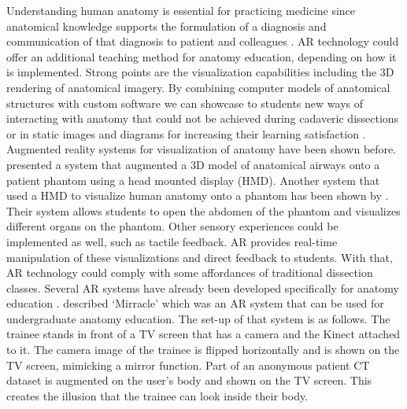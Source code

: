 Understanding human anatomy is essential for practicing medicine since anatomical knowledge supports the formulation of a diagnosis and communication of that diagnosis to patient and colleagues \cite{Frank2005}.  AR technology could offer an additional teaching method for anatomy education, depending on how it is implemented. Strong points are the visualization capabilities including the 3D rendering of anatomical imagery.
By combining computer models of anatomical structures with custom software we can showcase to students new ways of interacting with anatomy that could not be achieved during cadaveric dissections or in static images and diagrams for increasing their learning satisfaction \cite{Bacca2014,ma2013ismar,NMC2014}.
Augmented reality systems for visualization of anatomy have been shown before. \cite{Davis2002} presented a system that augmented a 3D model of anatomical airways onto a patient phantom using a head mounted display (HMD). Another system that used a HMD to visualize human anatomy onto a phantom has been shown by \cite{Juan2008a}. Their system allows students to open the abdomen of the phantom and visualizes different organs on the phantom.
Other sensory experiences could be implemented as well, such as tactile feedback. AR provides real-time manipulation of these visualizations and direct feedback to students. With that, AR technology could comply with some affordances of traditional dissection classes. Several AR systems have already been developed specifically for anatomy education \cite{Thomas2010,Chien2010,Blum2012b}. 
\citet{Blum2012b} described `Mirracle' which was an AR system that can be used for undergraduate anatomy education. The set-up of that system is as follows. The trainee stands in front of a TV screen that has a camera and the Kinect attached to it. The camera image of the trainee is flipped horizontally and is shown on the TV screen, mimicking a mirror function. Part of an anonymous patient CT dataset is augmented on the user's body and shown on the TV screen. This creates the illusion that the trainee can look inside their body. 


